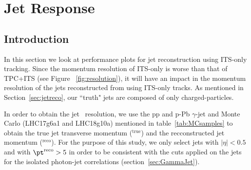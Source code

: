 \section{Jet Response}
\subsection{Introduction}
\label{sec:jetresponse}
In this section we look at performance plots for jet reconstruction using ITS-only tracking. Since the momentum resolution of ITS-only is worse than that of TPC+ITS (see Figure ~\ref{fig:resolution}), it will have an impact in the momentum resolution of the jets reconstructed from using ITS-only tracks. As mentioned in Section~\ref{sec:jetreco}, our ``truth" jets are composed of only charged-particles.  

In order to obtain the jet \pt~resolution, we use the pp and p-Pb $\gamma$-jet  and  Monte Carlo (LHC17g6a1 and LHC18g10a) mentioned in table~\ref{tab:MCsamples} to obtain the true jet transverse momentum (\pt$^{\mathrm{true}}$) and the recconstructed jet momentum (\pt$^{\mathrm{reco}}$). For the purpose of this study, we only select jets with {$|\eta| < 0.5$} and with {$\pt^{\mathrm{reco}} > 5$ \GeVc} in order to be consistent with the cuts applied on the jets for the isolated photon-jet correlations (section~\ref{sec:GammaJet}).


